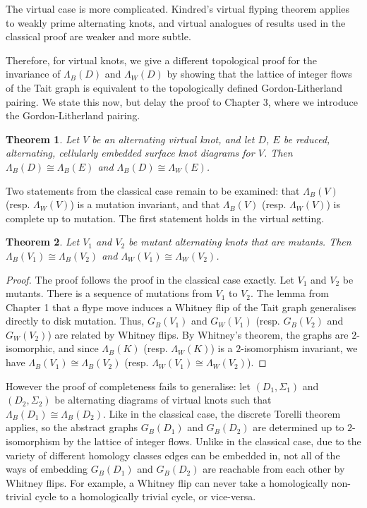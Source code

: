 \documentclass[12pt]{report}
\newtheorem*{theorem}{Theorem}
\theoremstyle{upright}
\begin{document}
The virtual case is more complicated. Kindred's virtual flyping theorem applies to weakly prime alternating knots, and virtual analogues of  results used in the classical proof are weaker and more subtle.

Therefore, for virtual knots, we give a different topological proof for the invariance of $\Lambda_{B}(D)$ and $\Lambda_{W}(D)$ by showing that the lattice of integer flows of the Tait graph is equivalent to the topologically defined Gordon-Litherland pairing. We state this now, but delay the proof to Chapter 3, where we introduce the Gordon-Litherland pairing.

\begin{theorem}
Let $V$ be an alternating virtual knot, and let $D$, $E$ be reduced, alternating, cellularly embedded surface knot diagrams for $V$. Then $\Lambda_{B}(D) \cong \Lambda_{B}(E)$ and $\Lambda_{B}(D) \cong \Lambda_{W}(E)$.
\end{theorem}

Two statements from the classical case remain to be examined: that $\Lambda_{B}(V)$ (resp. $\Lambda_{W}(V)$) is a mutation invariant, and that $\Lambda_{B}(V)$ (resp. $\Lambda_{W}(V)$) is complete up to mutation. The first statement holds in the virtual setting.
\begin{theorem}
Let $V_{1}$ and $V_{2}$ be mutant alternating knots that are mutants. Then $\Lambda_{B}(V_{1}) \cong \Lambda_{B}(V_{2})$ and $\Lambda_{W}(V_{1}) \cong \Lambda_{W}(V_{2})$.
\end{theorem}
\begin{proof}
The proof follows the proof in the classical case exactly. Let $V_{1}$ and $V_{2}$ be mutants. There is a sequence of mutations from $V_{1}$ to $V_{2}$. The lemma from Chapter 1 that a flype move induces a Whitney flip of the Tait graph generalises directly to disk mutation. Thus, $G_{B}(V_{1})$ and $G_{W}(V_{1})$ (resp. $G_{B}(V_{2})$ and $G_{W}(V_{2})$) are related by Whitney flips. By Whitney's theorem, the graphs are $2$-isomorphic, and since $\Lambda_{B}(K)$ (resp. $\Lambda_{W}(K)$) is a $2$-isomorphism invariant, we have $\Lambda_{B}(V_{1}) \cong \Lambda_{B}(V_{2})$ (resp. $\Lambda_{W}(V_{1}) \cong \Lambda_{W}(V_{2})$).
\end{proof}

However the proof of completeness fails to generalise: let $(D_{1}, \Sigma_{1})$ and $(D_{2}, \Sigma_{2})$ be alternating diagrams of virtual knots such that $\Lambda_{B}(D_{1}) \cong \Lambda_{B}(D_{2})$. Like in the classical case, the discrete Torelli theorem applies, so the abstract graphs $G_{B}(D_{1})$ and $G_{B}(D_{2})$ are determined up to $2$-isomorphism by the lattice of integer flows. Unlike in the classical case, due to the variety of different homology classes edges can be embedded in, not all of the ways of embedding $G_{B}(D_{1})$ and $G_{B}(D_{2})$ are reachable from each other by Whitney flips. For example, a Whitney flip can never take a homologically non-trivial cycle to a homologically trivial cycle, or vice-versa.
\end{document}
